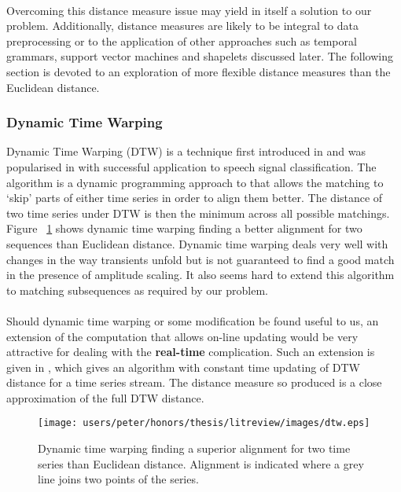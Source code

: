 	\paragraph{}
	Overcoming this distance measure issue may yield in itself a solution to our problem. Additionally, distance measures are likely to be integral to data preprocessing or to the application of other approaches such as temporal grammars, support vector machines and shapelets discussed later. The following section is devoted to an exploration of more flexible distance measures than the Euclidean distance.
	
	\subsubsection{Dynamic Time Warping}
	Dynamic Time Warping (DTW) is a technique first introduced in \citep{sakoe1978dynamic} and was popularised in \citep{berndt1994using} with successful application to speech signal classification. The algorithm is a dynamic programming approach to that allows the matching to `skip' parts of either time series in order to align them better. The distance of two time series under DTW is then the minimum across all possible matchings. Figure ~\ref{fig:dtwinaction} shows dynamic time warping finding a better alignment for two sequences than Euclidean distance. Dynamic time warping deals very well with changes in the way transients unfold but is not guaranteed to find a good match in the presence of amplitude scaling. It also seems hard to extend this algorithm to matching subsequences as required by our problem.
	\paragraph{}
	Should dynamic time warping or some modification be found useful to us, an extension of the computation that allows on-line updating would be very attractive for dealing with the \textbf{real-time} complication. Such an extension is given in \citep{capitani2007warping}, which gives an algorithm with constant time updating of DTW distance for a time series stream. The distance measure so produced is a close approximation of the full DTW distance.
	
	\begin{figure}[h!]
			\label{fig:dtwinaction}
	\centering
	\texttt{[image: users/peter/honors/thesis/litreview/images/dtw.eps]}
	\caption{Dynamic time warping finding a superior alignment for two time series than Euclidean distance. Alignment is indicated where a grey line joins two points of the series.}
	\end{figure}


